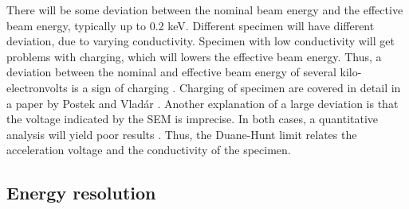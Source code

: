 There will be some deviation between the nominal beam energy and the effective beam energy, typically up to 0.2 keV.
Different specimen will have different deviation, due to varying conductivity.
Specimen with low conductivity will get problems with charging, which will lowers the effective beam energy.
Thus, a deviation between the nominal and effective beam energy of several kilo-electronvolts is a sign of charging \cite{dtsaii_2_manipulating_spectra}.
Charging of specimen are covered in detail in a paper by Postek and Vladár \cite{postek_charging_2015}.
Another explanation of a large deviation is that the voltage indicated by the SEM is imprecise.
In both cases, a quantitative analysis will yield poor results \cite{iso_emsa_22029}.
Thus, the Duane-Hunt limit relates the acceleration voltage and the conductivity of the specimen.








\subsection{Energy resolution}
\label{theory:eds_performance:energyres}


